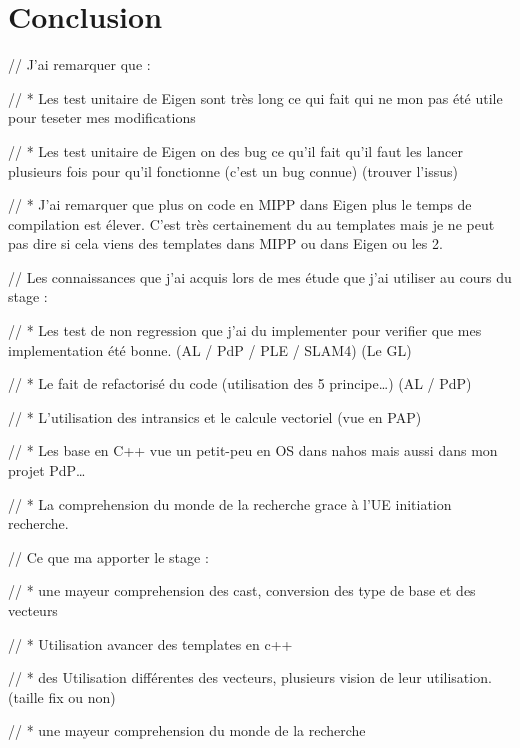 \section{Conclusion}

// J'ai remarquer que :

// * Les test unitaire de Eigen sont très long ce qui fait qui ne mon pas été utile
pour teseter mes modifications

// * Les test unitaire de Eigen on des bug ce qu'il fait qu'il faut les lancer plusieurs
fois pour qu'il fonctionne (c'est un bug connue) (trouver l'issus)

// * J'ai remarquer que plus on code en MIPP dans Eigen plus le temps de compilation est
élever. C'est très certainement du au templates mais je ne peut pas dire si cela viens
des templates dans MIPP ou dans Eigen ou les 2.

// Les connaissances que j'ai acquis lors de mes étude que j'ai utiliser au cours du
stage :

// * Les test de non regression que j'ai du implementer pour verifier que mes
implementation été bonne. (AL / PdP / PLE / SLAM4) (Le GL)

// * Le fait de refactorisé du code (utilisation des 5 principe\dots) (AL / PdP)

// * L'utilisation des intransics et le calcule vectoriel (vue en PAP)

// * Les base en C++ vue un petit-peu en OS dans nahos mais aussi dans mon projet PdP\dots

// * La comprehension du monde de la recherche grace à l'UE initiation recherche.

// Ce que ma apporter le stage :

// * une mayeur comprehension des cast, conversion des type de base et des vecteurs

// * Utilisation avancer des templates en c++

// * des Utilisation différentes des vecteurs, plusieurs vision de leur utilisation.
(taille fix ou non)

// * une mayeur comprehension du monde de la recherche

